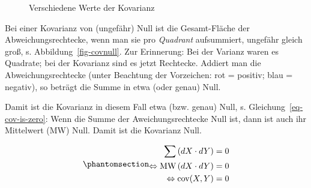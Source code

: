 \documentclass[
  letterpaper,
]{scrbook}
\theoremstyle{definition}
\theoremstyle{definition}
\theoremstyle{definition}
\theoremstyle{remark}
\begin{document}
\begin{figure}
\begin{minipage}{0.33\linewidth}
{}


\end{minipage}%

\caption{\label{fig-demos-cov}Verschiedene Werte der Kovarianz}

\end{figure}%

Bei einer Kovarianz von (ungefähr) Null ist die Gesamt-Fläche der
Abweichungsrechtecke, wenn man sie pro \emph{Quadrant} aufsummiert,
ungefähr gleich groß, s. Abbildung~\ref{fig-covnull}. Zur Erinnerung:
Bei der Varianz waren es Quadrate; bei der Kovarianz sind es jetzt
Rechtecke. Addiert man die Abweichungsrechtecke (unter Beachtung der
Vorzeichen: rot = positiv; blau = negativ), so beträgt die Summe in etwa
(oder genau) Null.

Damit ist die Kovarianz in diesem Fall etwa (bzw. genau) Null, s.
Gleichung~\ref{eq-cov-is-zero}: Wenn die Summe der Aweichungsrechtecke
Null ist, dann ist auch ihr Mittelwert (MW) Null. Damit ist die
Kovarianz Null.

\begin{equation}\phantomsection\label{eq-cov-is-zero}{\begin{aligned}
\sum \left(dX \cdot dY \right) &= 0\\
\Leftrightarrow \text{MW} \left(dX \cdot dY \right) &= 0\\
\Leftrightarrow \text{cov}(X, Y) &= 0
\end{aligned}}\end{equation}
\end{document}
